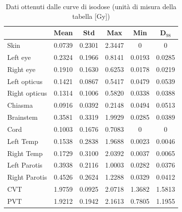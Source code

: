 \documentclass[a4paper,12pt]{article}
\begin{document}
                \begin{table}[H]
                        \centering
                        \label{tab:dati_caso_clinico_fotoni}
                        \begin{tabular}{
                            l | c | c | c | c | c |
                        }
                            \toprule
                            & Mean & Std & Max & Min & D$_{98}$\\
                            \midrule
                            Skin & 0.0739 & 0.2301 & 2.3447 & 0 & 0 \\
                            Left eye & 0.2324 & 0.1966 & 0.8141 & 0.0193 & 0.0285 \\
                            Right eye & 0.1910 & 0.1630 & 0.6253 & 0.0178 & 0.0219 \\
                            Left opticus & 0.1421 & 0.0867 & 0.5417 & 0.0479 & 0.0539 \\
                            Right opticus & 0.1314 & 0.1006 & 0.5820 & 0.0338 & 0.0388 \\
                            Chiasma & 0.0916 & 0.0392 & 0.2148 & 0.0494 & 0.0513 \\
                            Brainstem & 0.3581 & 0.3319 & 1.9929 & 0.0285 & 0.0389 \\
                            Cord & 0.1003 & 0.1676 & 0.7083 & 0 & 0 \\
                            Left Temp & 0.1538 & 0.2838 & 1.9688 & 0.0023 & 0.0046 \\
                            Right Temp & 0.1729 & 0.3100 & 2.0392 & 0.0037 & 0.0065 \\
                            Left Parotis & 0.3938 & 0.2116 & 1.0003 & 0.0282 & 0.0376 \\
                            Right Parotis & 0.4526 & 0.2624 & 1.2288 & 0.0329 & 0.0412 \\
                            CVT & 1.9759 & 0.0925 & 2.0718 & 1.3682 & 1.5813 \\
                            PVT & 1.9212 & 0.1942 & 2.1613 & 0.7805 & 1.1955 \\
                            \bottomrule
                        \end{tabular}
                        \caption{Dati ottenuti dalle curve di isodose (unità di misura della tabella [\unit{\gray}])}
                    \end{table}
\end{document}
